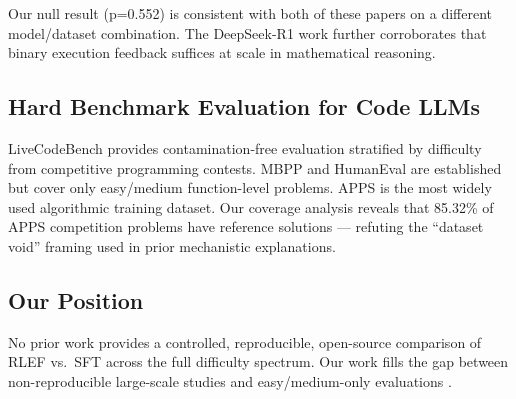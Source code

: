 Our null result (p=0.552) is consistent with both of these papers on a different model/dataset combination. The DeepSeek-R1 work \cite{DeepSeekAI2025R1} further corroborates that binary execution feedback suffices at scale in mathematical reasoning.

\subsection{Hard Benchmark Evaluation for Code LLMs}

LiveCodeBench \cite{Jain2024LiveCodeBench} provides contamination-free evaluation stratified by difficulty from competitive programming contests. MBPP \cite{Austin2021MBPP} and HumanEval \cite{Chen2021HumanEval} are established but cover only easy/medium function-level problems. APPS \cite{Hendrycks2021APPS} is the most widely used algorithmic training dataset. Our coverage analysis reveals that 85.32\% of APPS competition problems have reference solutions --- refuting the ``dataset void'' framing used in prior mechanistic explanations.

\subsection{Our Position}

No prior work provides a controlled, reproducible, open-source comparison of RLEF vs.\ SFT across the full difficulty spectrum. Our work fills the gap between non-reproducible large-scale studies \cite{Gehring2024RLEF,DeepSeekAI2025R1} and easy/medium-only evaluations \cite{Le2022CodeRL,Majeed2023PPOCoder,Liu2023RLTF}.
